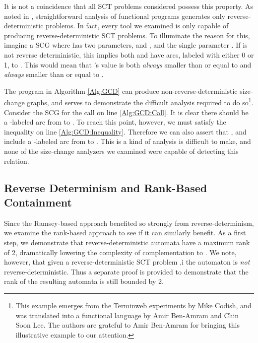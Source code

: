 \documentclass{LMCS}
\begin{document}
It is not a coincidence that all SCT problems considered possess this property. 
As noted in \cite{BL07}, straightforward analysis of functional programs
generates only reverse-deterministic problems. In fact, every tool we examined is
only capable of producing reverse-deterministic SCT problems.
To illuminate the reason for this, imagine a
SCG  where  has  two parameters,  and , and 
the single parameter . If  is not reverse deterministic, this implies both
 and  have arcs, labeled with either 0 or 1, to .  This would mean that
's value is both \emph{always} smaller than or equal to  and \emph{always}
smaller than or equal to . 

The program in Algorithm \ref{Alg:GCD} can produce non-reverse-deterministic
size-change graphs, and serves to demonstrate the difficult analysis required to
do so\footnote{This example emerges from the Terminweb experiments by Mike
Codish, and was translated into a functional language by Amir Ben-Amram and Chin
Soon Lee. The authors are grateful to Amir Ben-Amram for bringing this
illustrative example to our attention.}.  Consider the SCG for the call on line
\ref{Alg:GCD:Call}. It is clear there should be a -labeled arc from  to
. To reach this point, however, we must satisfy the inequality on line
\ref{Alg:GCD:Inequality}. Therefore we can also assert that , and include a
-labeled arc from  to . This is a kind of analysis is difficult to
make, and none of the size-change analyzers we examined were capable of
detecting this relation.


\LinesNumbered
{}
\begin{algorithm}[tp]
\DontPrintSemicolon
\caption{}
\label{Alg:GCD}
  \If{\label{Alg:GCD:Inequality}}
  {
     \GCD{, }\label{Alg:GCD:Call}\;
  }
  \ElseIf{}
  {
     \GCD{,}\;
  }
  \lElse
  {
     \Return 
  }
\end{algorithm}



\subsection{Reverse Determinism and Rank-Based Containment}

Since the Ramsey-based approach benefited so strongly from reverse-determinism,
we examine the rank-based approach to see if it can similarly benefit.  As a
first step, we demonstrate that reverse-deterministic automata have a maximum
rank of 2, dramatically lowering the complexity of complementation to . We note, however,
that given a reverse-deterministic SCT problem ,i the automaton  is \emph{not}
reverse-deterministic.  Thus a separate proof is provided to demonstrate that the rank of the
resulting automata is still bounded by 2. 
\end{document}
